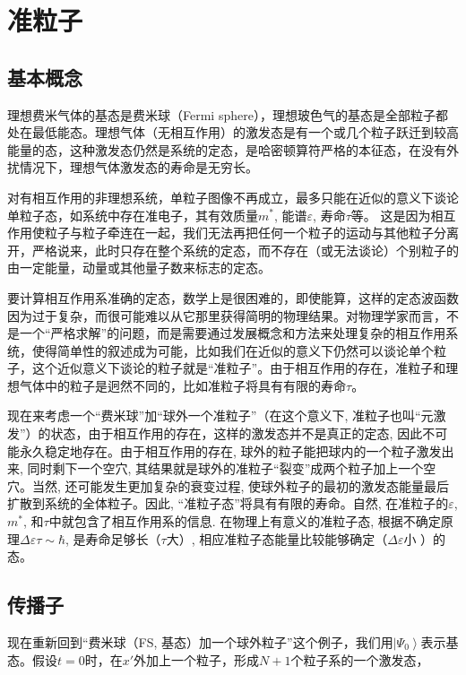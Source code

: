\section{准粒子}

\subsection{基本概念}

理想费米气体的基态是费米球（Fermi sphere），理想玻色气的基态是全部粒子都处在最低能态。理想气体（无相互作用）的激发态是有一个或几个粒子跃迁到较高能量的态，这种激发态仍然是系统的定态，是哈密顿算符严格的本征态，在没有外扰情况下，理想气体激发态的寿命是无穷长。

对有相互作用的非理想系统，单粒子图像不再成立，最多只能在近似的意义下谈论单粒子态，如系统中存在准电子，其有效质量$m^*$, 能谱$\varepsilon$, 寿命$\tau$等。
这是因为相互作用使粒子与粒子牵连在一起，我们无法再把任何一个粒子的运动与其他粒子分离开，严格说来，此时只存在整个系统的定态，而不存在（或无法谈论）个别粒子的由一定能量，动量或其他量子数来标志的定态。

要计算相互作用系准确的定态，数学上是很困难的，即使能算，这样的定态波函数因为过于复杂，而很可能难以从它那里获得简明的物理结果。对物理学家而言，不是一个“严格求解”的问题，而是需要通过发展概念和方法来处理复杂的相互作用系统，使得简单性的叙述成为可能，比如我们在近似的意义下仍然可以谈论单个粒子，这个近似意义下谈论的粒子就是“准粒子”。由于相互作用的存在，准粒子和理想气体中的粒子是迥然不同的，比如准粒子将具有有限的寿命$\tau$。

现在来考虑一个“费米球”加“球外一个准粒子”（在这个意义下,
准粒子也叫“元激发”）的状态，由于相互作用的存在，这样的激发态并不是真正的定态, 因此不可能永久稳定地存在。由于相互作用的存在, 球外的粒子能把球内的一个粒子激发出来,
同时剩下一个空穴, 其结果就是球外的准粒子“裂变”成两个粒子加上一个空穴。当然, 还可能发生更加复杂的衰变过程,
使球外粒子的最初的激发态能量最后扩散到系统的全体粒子。因此, “准粒子态”将具有有限的寿命。自然, 在准粒子的$\varepsilon$, $m^*$, 和$\tau$中就包含了相互作用系的信息. 在物理上有意义的准粒子态, 根据不确定原理$ \Delta \varepsilon \tau \sim \hbar$, 是寿命足够长（$\tau$大）, 相应准粒子态能量比较能够确定（$\Delta \varepsilon $小 ）的态。

\subsection{传播子}

现在重新回到“费米球（FS, 基态）加一个球外粒子”这个例子，我们用$\left| \Psi_0 \right\rangle$表示基态。假设$t=0$时，在$x'$外加上一个粒子，形成$N+1$个粒子系的一个激发态，

